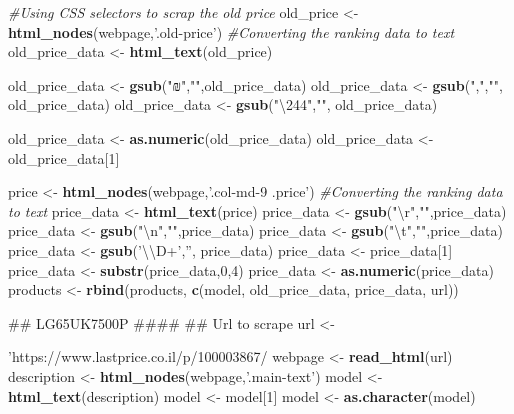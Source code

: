\documentclass[]{article}
\newenvironment{Shaded}{\begin{snugshade}}{\end{snugshade}}
\newcommand{\KeywordTok}[1]{\textcolor[rgb]{0.13,0.29,0.53}{\textbf{#1}}}
\newcommand{\DecValTok}[1]{\textcolor[rgb]{0.00,0.00,0.81}{#1}}
\newcommand{\CharTok}[1]{\textcolor[rgb]{0.31,0.60,0.02}{#1}}
\newcommand{\StringTok}[1]{\textcolor[rgb]{0.31,0.60,0.02}{#1}}
\newcommand{\CommentTok}[1]{\textcolor[rgb]{0.56,0.35,0.01}{\textit{#1}}}
\newcommand{\NormalTok}[1]{#1}
\begin{document}
\begin{Shaded}
\begin{Highlighting}[]
{{{{{\CommentTok{#Using CSS selectors to scrap the old price}
\NormalTok{old_price <-}\StringTok{ }\KeywordTok{html_nodes}\NormalTok{(webpage,}\StringTok{'.old-price'}\NormalTok{)}
\CommentTok{#Converting the ranking data to text }
\NormalTok{old_price_data <-}\StringTok{ }\KeywordTok{html_text}\NormalTok{(old_price)}

\NormalTok{old_price_data <-}\StringTok{ }\KeywordTok{gsub}\NormalTok{(}\StringTok{"₪"}\NormalTok{,}\StringTok{""}\NormalTok{,old_price_data)}
\NormalTok{old_price_data <-}\StringTok{ }\KeywordTok{gsub}\NormalTok{(}\StringTok{","}\NormalTok{,}\StringTok{""}\NormalTok{, old_price_data)}
\NormalTok{old_price_data <-}\StringTok{ }\KeywordTok{gsub}\NormalTok{(}\StringTok{"\textbackslash{}244"}\NormalTok{,}\StringTok{""}\NormalTok{, old_price_data)}

\NormalTok{old_price_data <-}\StringTok{ }\KeywordTok{as.numeric}\NormalTok{(old_price_data)}
\NormalTok{old_price_data <-}\StringTok{ }\NormalTok{old_price_data[}\DecValTok{1}\NormalTok{]}

\NormalTok{price <-}\StringTok{ }\KeywordTok{html_nodes}\NormalTok{(webpage,}\StringTok{'.col-md-9 .price'}\NormalTok{)}
\CommentTok{#Converting the ranking data to text }
\NormalTok{price_data <-}\StringTok{ }\KeywordTok{html_text}\NormalTok{(price)}
\NormalTok{price_data <-}\StringTok{ }\KeywordTok{gsub}\NormalTok{(}\StringTok{"}\CharTok{\textbackslash{}r}\StringTok{"}\NormalTok{,}\StringTok{""}\NormalTok{,price_data) }
\NormalTok{price_data <-}\StringTok{ }\KeywordTok{gsub}\NormalTok{(}\StringTok{"}\CharTok{\textbackslash{}n}\StringTok{"}\NormalTok{,}\StringTok{""}\NormalTok{,price_data) }
\NormalTok{price_data <-}\StringTok{ }\KeywordTok{gsub}\NormalTok{(}\StringTok{"}\CharTok{\textbackslash{}t}\StringTok{"}\NormalTok{,}\StringTok{""}\NormalTok{,price_data) }
\NormalTok{price_data <-}\StringTok{ }\KeywordTok{gsub}\NormalTok{(}\StringTok{'}\CharTok{\textbackslash{}\textbackslash{}}\StringTok{D+'}\NormalTok{,}\StringTok{''}\NormalTok{, price_data)}
\NormalTok{price_data <-}\StringTok{ }\NormalTok{price_data[}\DecValTok{1}\NormalTok{]}
\NormalTok{price_data <-}\StringTok{ }\KeywordTok{substr}\NormalTok{(price_data,}\DecValTok{0}\NormalTok{,}\DecValTok{4}\NormalTok{)}
\NormalTok{price_data <-}\StringTok{ }\KeywordTok{as.numeric}\NormalTok{(price_data)}
\NormalTok{products <-}\StringTok{ }\KeywordTok{rbind}\NormalTok{(products, }\KeywordTok{c}\NormalTok{(model, old_price_data, price_data, url))}

\NormalTok{## LG65UK7500P ####}
\NormalTok{## Url to scrape}
\NormalTok{url <-}\StringTok{'https://www.lastprice.co.il/p/100003867/%D7%98%D7%9C%D7%95%D7%99%D7%96%D7%99%D7%94-65-LG/LG-65UK7500P'}
\NormalTok{webpage <-}\StringTok{ }\KeywordTok{read_html}\NormalTok{(url) }
\NormalTok{description <-}\StringTok{ }\KeywordTok{html_nodes}\NormalTok{(webpage,}\StringTok{'.main-text'}\NormalTok{)}
\NormalTok{model <-}\StringTok{ }\KeywordTok{html_text}\NormalTok{(description)}
\NormalTok{model <-}\StringTok{ }\NormalTok{model[}\DecValTok{1}\NormalTok{]}
\NormalTok{model <-}\StringTok{ }\KeywordTok{as.character}\NormalTok{(model)}

}}}}}}
\end{Highlighting}
\end{Shaded}
\end{document}
